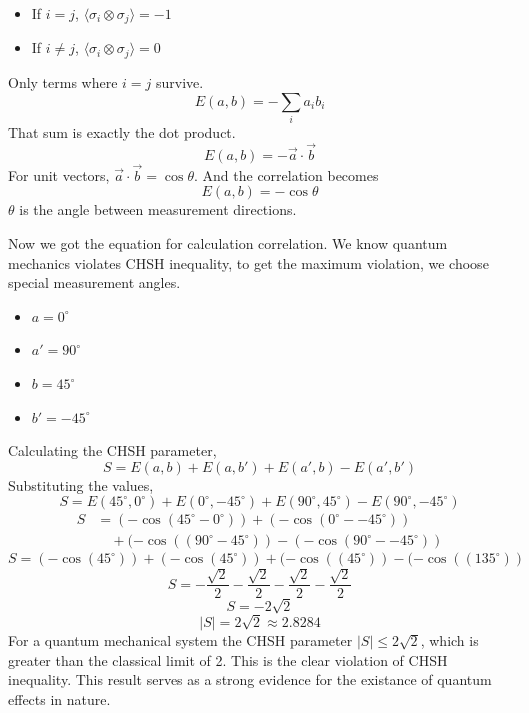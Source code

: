 \documentclass[14pt,a4paper]{extarticle}
\begin{document}
\begin{itemize}
\item If $i=j$, $\langle \sigma_i \otimes \sigma_j \rangle=-1$
\item If $i \neq j$, $\langle \sigma_i \otimes \sigma_j \rangle=0$
\end{itemize}

Only terms where $i=j$ survive.
\begin{equation}
E(a,b) = - \sum_i a_i b_i
\end{equation}
That sum is exactly the dot product.
\begin{equation}
E(a,b) = - \vec{a} \cdot \vec{b}
\end{equation}
For unit vectors, $\vec{a} \cdot \vec{b} = \cos \theta$. And the correlation becomes
\begin{equation}
E(a,b) = - \cos \theta
\end{equation}
$\theta$ is the angle between measurement directions.

Now we got the equation for calculation correlation. We know quantum mechanics violates CHSH inequality, to get the maximum violation, we choose special measurement angles.
\begin{itemize}
\item $a=0^\circ$
\item $a'=90^\circ$
\item $b=45^\circ$
\item $b'=-45^\circ$
\end{itemize}
Calculating the CHSH parameter,
\[
S = E(a,b) + E(a,b') + E(a',b) - E(a',b')
\]
Substituting the values,
\[
S = E(45^\circ,0^\circ) + E(0^\circ,-45^\circ) + E(90^\circ,45^\circ) - E(90^\circ,-45^\circ)
\]
\begin{equation*}
\begin{aligned}
S &= (-\cos(45^\circ-0^\circ)) + (-\cos(0^\circ--45^\circ)) \\
&\quad+ (-\cos((90^\circ-45^\circ)) - (-\cos(90^\circ--45^\circ))
\end{aligned}
\end{equation*}
\[
S = (-\cos(45^\circ)) + (-\cos(45^\circ)) + (-\cos((45^\circ)) - (-\cos((135^\circ))
\]
\[
S = -\frac{\sqrt{2}}{2} - \frac{\sqrt{2}}{2} - \frac{\sqrt{2}}{2} - \frac{\sqrt{2}}{2}
\]
\[
S = -2\sqrt{2}
\]
\[
|S| = 2\sqrt{2} \approx 2.8284
\]
For a quantum mechanical system the CHSH parameter $|S| \leq 2\sqrt{2}$, which is greater than the classical limit of 2. This is the clear violation of CHSH inequality. This result serves as a strong evidence for the existance of quantum effects in nature.
\end{document}

